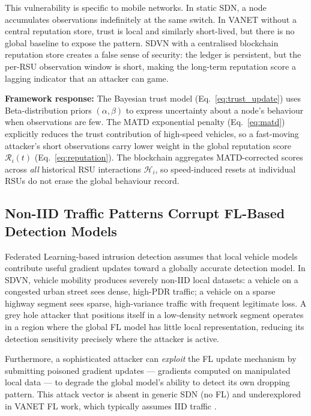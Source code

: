 \documentclass[12pt, a4paper]{report}
\newcommand{\mypar}{\vspace{0.8em}\noindent}
\begin{document}
This vulnerability is specific to mobile networks. In static SDN, a node
accumulates observations indefinitely at the same switch. In VANET without a
central reputation store, trust is local and similarly short-lived, but there is
no global baseline to expose the pattern. SDVN with a centralised blockchain
reputation store creates a false sense of security: the ledger is persistent, but
the per-RSU observation window is short, making the long-term reputation score
a lagging indicator that an attacker can game.

\mypar
\textbf{Framework response:} The Bayesian trust model (Eq.~\eqref{eq:trust_update})
uses Beta-distribution priors $(\alpha, \beta)$ to express uncertainty about a
node's behaviour when observations are few. The MATD exponential penalty
(Eq.~\eqref{eq:matd}) explicitly reduces the trust contribution of high-speed
vehicles, so a fast-moving attacker's short observations carry lower weight in
the global reputation score $\mathcal{R}_i(t)$ (Eq.~\eqref{eq:reputation}).
The blockchain aggregates MATD-corrected scores across \emph{all} historical RSU
interactions $\mathcal{H}_i$, so speed-induced resets at individual RSUs do not
erase the global behaviour record.

\subsection{Non-IID Traffic Patterns Corrupt FL-Based Detection Models}

Federated Learning-based intrusion detection assumes that local vehicle models
contribute useful gradient updates toward a globally accurate detection model.
In SDVN, vehicle mobility produces severely non-IID local datasets: a vehicle
on a congested urban street sees dense, high-PDR traffic; a vehicle on a sparse
highway segment sees sparse, high-variance traffic with frequent legitimate loss.
A grey hole attacker that positions itself in a low-density network segment
operates in a region where the global FL model has little local representation,
reducing its detection sensitivity precisely where the attacker is active.

Furthermore, a sophisticated attacker can \emph{exploit} the FL update mechanism
by submitting poisoned gradient updates — gradients computed on manipulated local
data — to degrade the global model's ability to detect its own dropping pattern.
This attack vector is absent in generic SDN (no FL) and underexplored in VANET
FL work, which typically assumes IID traffic \cite{ahsan2024flbert}.
\end{document}
